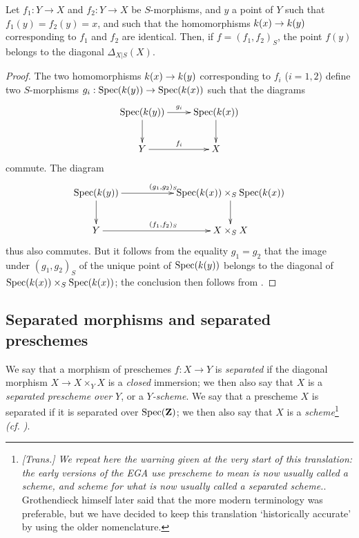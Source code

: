 \begin{corollary}[5.3.17]
\label{I.5.3.17}
Let $f_1:Y\to X$ and $f_2:Y\to X$ be $S$-morphisms, and $y$ a point of $Y$ such that $f_1(y)=f_2(y)=x$, and such that the homomorphisms $\kres(x)\to\kres(y)$ corresponding to $f_1 $ and $f_2$ are identical.
Then, if $f=(f_1,f_2)_S$, the point $f(y)$ belongs to the diagonal $\Delta_{X|S}(X)$.
\end{corollary}

\begin{proof}
The two homomorphisms $\kres(x)\to\kres(y)$ corresponding to $f_i$ ($i=1,2$) define two $S$-morphisms $g_i:\Spec(\kres(y))\to\Spec(\kres(x))$ such that the diagrams
\[
  \xymatrix{
    \Spec(\kres(y))\ar[r]^{g_i}\ar[d] &
    \Spec(\kres(x))\ar[d]\\
    Y\ar[r]^{f_i} &
    X
  }
\]
commute.
The diagram
\[
  \xymatrix{
    \Spec(\kres(y))\ar[rr]^{(g_1,g_2)_S}\ar[d] & &
    \Spec(\kres(x))\times_S\Spec(\kres(x))\ar[d]\\
    Y\ar[rr]^{(f_1,f_2)_S} & &
    X\times_S X
  }
\]
thus also commutes.
But it follows from the equality $g_1=g_2$ that the image under $(g_1,g_2)_S$ of the unique point of $\operatorname{Spec}(k(y))$ belongs to the diagonal of $\operatorname{Spec}(k(x))\times_S\operatorname{Spec}(k(x))$;
the conclusion then follows from .
\end{proof}

\subsection{Separated morphisms and separated preschemes}
\label{subsection:I.5.4}

\begin{definition}[5.4.1]
\label{I.5.4.1}
We say that a morphism of preschemes $f:X\to Y$ is \emph{separated} if the diagonal morphism $X\to X\times_Y X$ is a \emph{closed} immersion; we then also say that $X$ is a \emph{separated prescheme over $Y$}, or a \emph{$Y$-scheme}.
We say that a prescheme $X$ is separated if it is separated over $\operatorname{Spec}(\mathbf{Z})$;
we then also say that $X$ is a \emph{scheme}\footnote{\emph{[Trans.] We repeat here the warning given at the very start of this translation: the early versions of the EGA use \emph{prescheme} to mean is now usually called a scheme, and \emph{scheme} for what is now usually called a separated scheme.}. Grothendieck himself later said that the more modern terminology was preferable, but we have decided to keep this translation `historically accurate' by using the older nomenclature.} \emph{(cf. )}.
\end{definition}

